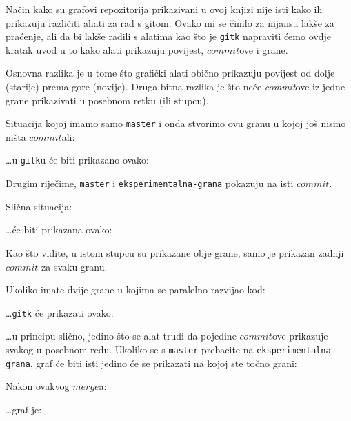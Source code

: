
Način kako su grafovi repozitorija prikazivani u ovoj knjizi nije isti kako ih prikazuju različiti aliati za rad s gitom.
Ovako mi se činilo za nijansu lakše za praćenje, ali da bi lakše radili s alatima kao što je \verb+gitk+ napraviti ćemo ovdje kratak uvod u to kako alati prikazuju povijest, $commit$ove i grane.

Osnovna razlika je u tome što grafički alati obično prikazuju povijest od dolje (starije) prema gore (novije). 
Druga bitna razlika je što neće \emph{commit}ove iz jedne grane prikazivati u posebnom retku (ili stupcu).


Situacija kojoj imamo samo \verb+master+ i onda stvorimo ovu granu u kojoj još nismo ništa $commit$ali:



\dots{}u \verb+gitk+u će biti prikazano ovako:


Drugim riječime, \verb+master+ i \verb+eksperimentalna-grana+ pokazuju na isti $commit$.

Slična situacija:



\dots{}će biti prikazana ovako:


Kao što vidite, u istom stupcu su prikazane obje grane, samo je prikazan zadnji $commit$ za svaku granu.

Ukoliko imate dvije grane u kojima se paralelno razvijao kod:



\dots{}\verb+gitk+ će prikazati ovako:


\dots{}u principu slično, jedino što se alat trudi da pojedine $commit$ove prikazuje svakog u posebnom redu.
Ukoliko se s \verb+master+ prebacite na \verb+eksperimentalna-grana+, graf će biti isti jedino će se prikazati na kojoj ste točno grani:


Nakon ovakvog $merge$a:



\dots{}graf je:

